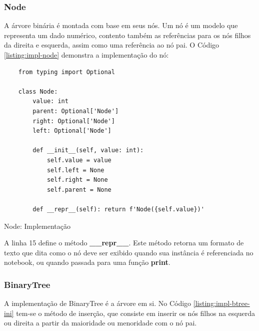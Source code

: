 \subsubsection{Node}

A árvore binária é montada com base em seus nós. Um nó é um modelo que representa um dado numérico, contento também
as referências para os nós filhos da direita e esquerda, assim como uma referência ao nó pai.\linebreak
O Código \ref{listing:impl-node} demonstra a implementação do nó:

\begin{listing}[H]
    \begin{verbatim}
    from typing import Optional

    class Node:
        value: int
        parent: Optional['Node']
        right: Optional['Node']
        left: Optional['Node']

        def __init__(self, value: int):
            self.value = value
            self.left = None
            self.right = None
            self.parent = None

        def __repr__(self): return f'Node({self.value})'
    \end{verbatim}
    \caption{Node: Implementação}
    \label{listing:impl-node}
\end{listing}

A linha 15 define o método \textbf{\_\_repr\_\_}. Este método retorna um formato de texto que dita como
o nó deve ser exibido quando sua instância é referenciada no notebook, ou quando passada para uma função \textbf{print}.

\subsubsection{BinaryTree}

A implementação de BinaryTree é a árvore em si. No Código \ref{listing:impl-btree-ini} tem-se o método de inserção,
que consiste em inserir os nós filhos na esquerda ou direita a partir da maioridade ou menoridade com o nó pai.

